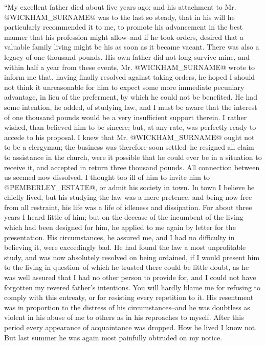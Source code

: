 ``My excellent father died about five years ago; and his attachment to
Mr. @WICKHAM_SURNAME@ was to the last so steady, that in his will he particularly
recommended it to me, to promote his advancement in the best manner
that his profession might allow--and if he took orders, desired that a
valuable family living might be his as soon as it became vacant. There
was also a legacy of one thousand pounds. His own father did not long
survive mine, and within half a year from these events, Mr. @WICKHAM_SURNAME@
wrote to inform me that, having finally resolved against taking orders,
he hoped I should not think it unreasonable for him to expect some more
immediate pecuniary advantage, in lieu of the preferment, by which he
could not be benefited. He had some intention, he added, of studying
law, and I must be aware that the interest of one thousand pounds would
be a very insufficient support therein. I rather wished, than believed
him to be sincere; but, at any rate, was perfectly ready to accede to
his proposal. I knew that Mr. @WICKHAM_SURNAME@ ought not to be a clergyman; the
business was therefore soon settled--he resigned all claim to assistance
in the church, were it possible that he could ever be in a situation to
receive it, and accepted in return three thousand pounds. All connection
between us seemed now dissolved. I thought too ill of him to invite him
to @PEMBERLEY_ESTATE@, or admit his society in town. In town I believe he chiefly
lived, but his studying the law was a mere pretence, and being now free
from all restraint, his life was a life of idleness and dissipation.
For about three years I heard little of him; but on the decease of the
incumbent of the living which had been designed for him, he applied to
me again by letter for the presentation. His circumstances, he assured
me, and I had no difficulty in believing it, were exceedingly bad. He
had found the law a most unprofitable study, and was now absolutely
resolved on being ordained, if I would present him to the living in
question--of which he trusted there could be little doubt, as he was
well assured that I had no other person to provide for, and I could not
have forgotten my revered father's intentions. You will hardly blame
me for refusing to comply with this entreaty, or for resisting every
repetition to it. His resentment was in proportion to the distress of
his circumstances--and he was doubtless as violent in his abuse of me
to others as in his reproaches to myself. After this period every
appearance of acquaintance was dropped. How he lived I know not. But
last summer he was again most painfully obtruded on my notice.

